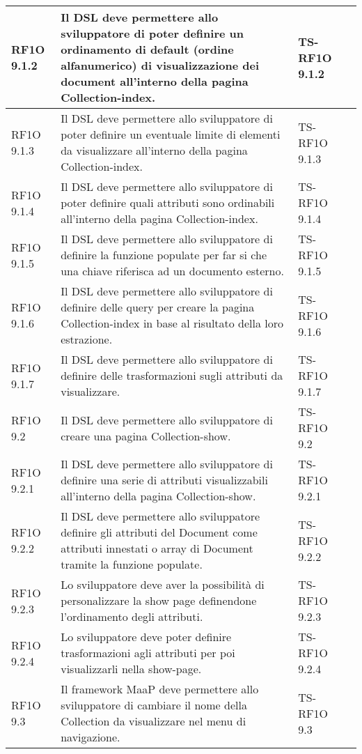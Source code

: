\begin{center}
\begin{longtable}{| p{2cm} | p{6cm} | p{2.5cm} | p{2.5cm} | }
					RF1O 9.1.2 & 
					Il DSL deve permettere allo sviluppatore di poter definire un ordinamento di default (ordine alfanumerico) di visualizzazione dei document all'interno della pagina Collection-index. & TS-RF1O 9.1.2 & \\ \hline 
					RF1O 9.1.3 & 
					Il DSL deve permettere allo sviluppatore di poter definire un eventuale limite di elementi da visualizzare all’interno della pagina Collection-index. & TS-RF1O 9.1.3 & \\ \hline 
					RF1O 9.1.4 & 
					Il DSL deve permettere allo sviluppatore di poter definire quali attributi sono ordinabili all’interno della pagina Collection-index. & TS-RF1O 9.1.4 & \\ \hline 
					RF1O 9.1.5 & 
					Il DSL deve permettere allo sviluppatore di definire la funzione populate per far si che una chiave riferisca ad un documento esterno. & TS-RF1O 9.1.5 & \\ \hline 
					RF1O 9.1.6 & 
					Il DSL deve permettere allo sviluppatore di definire delle query per creare la pagina Collection-index in base al risultato della loro estrazione. & TS-RF1O 9.1.6 & \\ \hline 
					RF1O 9.1.7 & 
					Il DSL deve permettere allo sviluppatore di definire delle trasformazioni sugli attributi da visualizzare. & TS-RF1O 9.1.7 & \\ \hline 
					RF1O 9.2 & 
					Il DSL deve permettere allo sviluppatore di creare una pagina Collection-show. & TS-RF1O 9.2 & \\ \hline 
					RF1O 9.2.1 & 
					Il DSL deve permettere allo sviluppatore di definire una serie di attributi visualizzabili all’interno della pagina Collection-show. & TS-RF1O 9.2.1 & \\ \hline 
					RF1O 9.2.2 & 
					Il DSL deve permettere allo sviluppatore definire gli attributi del Document come attributi innestati o array di Document tramite la funzione populate. & TS-RF1O 9.2.2 & \\ \hline 
					RF1O 9.2.3 & 
					Lo sviluppatore deve aver la possibilità di personalizzare la show page definendone l’ordinamento degli attributi. & TS-RF1O 9.2.3 & \\ \hline 
					RF1O 9.2.4 & 
					Lo sviluppatore deve poter definire trasformazioni agli attributi per poi visualizzarli nella show-page. & TS-RF1O 9.2.4 & \\ \hline 
					RF1O 9.3 & 
					Il framework MaaP deve permettere allo sviluppatore di cambiare il nome della Collection da visualizzare nel menu di navigazione. & TS-RF1O 9.3 & \\ \hline 

\end{longtable}
\end{center}
